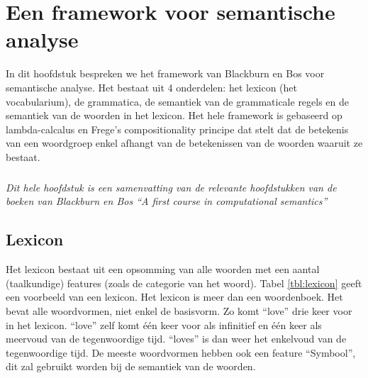 \chapter{Een framework voor semantische analyse}
In dit hoofdstuk bespreken we het framework van Blackburn en Bos \cite{Blackburn2005, Blackburn2006} voor semantische analyse. Het bestaat uit 4 onderdelen: het lexicon (het vocabularium), de grammatica, de semantiek van de grammaticale regels en de semantiek van de woorden in het lexicon. Het hele framework is gebaseerd op lambda-calcalus en Frege's compositionality principe dat stelt dat de betekenis van een woordgroep enkel afhangt van de betekenissen van de woorden waaruit ze bestaat.

\paragraph{} \textit{Dit hele hoofdstuk is een samenvatting van de relevante hoofdstukken van de boeken van Blackburn en Bos \cite{Blackburn2005, Blackburn2006} ``A first course in computational semantics''}

\section{Lexicon}
Het lexicon bestaat uit een opsomming van alle woorden met een aantal (taalkundige) features (zoals de categorie van het woord). Tabel \ref{tbl:lexicon} geeft een voorbeeld van een lexicon. Het lexicon is meer dan een woordenboek. Het bevat alle woordvormen, niet enkel de basisvorm. Zo komt ``love'' drie keer voor in het lexicon. ``love'' zelf komt één keer voor als infinitief en één keer als meervoud van de tegenwoordige tijd. ``loves'' is dan weer het enkelvoud van de tegenwoordige tijd. De meeste woordvormen hebben ook een feature ``Symbool'', dit zal gebruikt worden bij de semantiek van de woorden.

